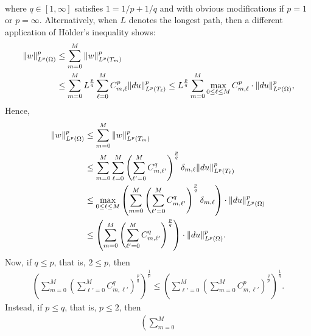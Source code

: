 \documentclass[10pt,a4paper]{article}
\begin{document}
\begin{remark}
\begin{align*}
    \end{align*}
    where $q \in [1,\infty]$ satisfies $1 = 1/p + 1/q$ and with obvious modifications if $p=1$ or $p=\infty$. 
    Alternatively, when $L$ denotes the longest path, then a different application of H\"older's inequality shows:
    \begin{align*}
        \| w \|_{L^{p}(\Omega)}^{p}
        &
        \leq 
        \sum_{m=0}^{M}
        \| w \|_{L^{p}(T_{m})}^{p}
        \\&
        \leq 
        \sum_{m=0}^{M}
        L^{\frac p q}
        \sum_{\ell=0}^{M} C_{m,\ell}^{p} \| d u \|_{L^{p}(T_{\ell})}^{p} 
        \leq 
        L^{\frac p q}
        \sum_{m=0}^{M} 
        \max_{ 0 \leq \ell \leq M }
        C_{m,\ell}^{p} 
        \cdot 
        \| d u \|_{L^{p}(\Omega)}^{p} 
        ,
    \end{align*}
    Hence, 
    \begin{align}
        \| w \|_{L^{p}(\Omega)}^{p}
        &
        \leq 
        \sum_{m=0}^{M}
        \| w \|_{L^{p}(T_{m})}^{p}
        \\&
        \leq 
        \sum_{m=0}^{M}
        \sum_{\ell=0}^{M} 
        \left( \sum_{\ell'=0}^{M} C_{m,\ell'}^{q} \right)^{\frac p q}
        \delta_{m,\ell} \| d u \|_{L^{p}(T_{\ell})}^{p} 
        \\&
        \leq 
        \max_{0 \leq \ell \leq M} \left(
            \sum_{m=0}^{M}
            \left( \sum_{\ell'=0}^{M} C_{m,\ell'}^{q} \right)^{\frac p q}
            \delta_{m,\ell} 
        \right)
        \cdot 
        \| d u \|_{L^{p}(\Omega)}^{p} 
        \\&
        \leq 
        \left(
            \sum_{m=0}^{M}
            \left( \sum_{\ell'=0}^{M} C_{m,\ell'}^{q} \right)^{\frac p q}
        \right)
        \cdot 
        \| d u \|_{L^{p}(\Omega)}^{p} 
        .
    \end{align}
    Now, if $q \leq p$, that is, $2 \leq p$, then 
    \begin{align}
        \left(
            \sum_{m=0}^{M}
            \left( \sum_{\ell'=0}^{M} C_{m,\ell'}^{q} \right)^{\frac p q}
        \right)^{\frac 1 p}
        \leq 
        \left(
            \sum_{\ell'=0}^{M}
            \left( \sum_{m=0}^{M} C_{m,\ell'}^{p} \right)^{\frac q p}
        \right)^{\frac 1 q}
        .
    \end{align}
    Instead, if $p \leq q$, that is, $p \leq 2$, then 
    \begin{align}
        \left(
            \sum_{m=0}^{M}

\end{align}
\end{remark}
\end{document}
